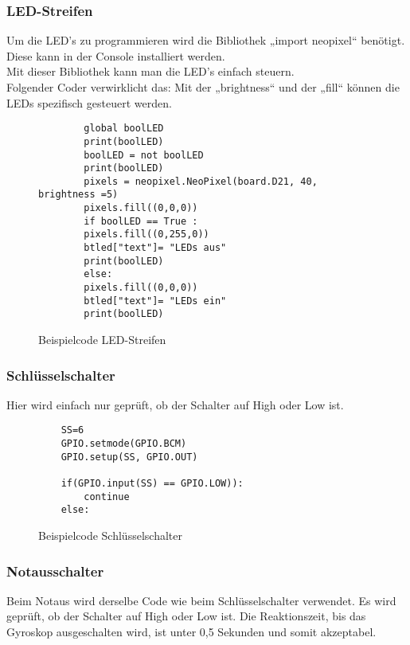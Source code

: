 \subsubsection{LED-Streifen}\label{sec:test Led}
Um die LED’s zu programmieren wird die Bibliothek „import neopixel“ benötigt. Diese kann in der Console installiert werden.\\
\vspace{3mm}
Mit dieser Bibliothek kann man die LED’s einfach steuern.\\
\vspace{3mm}
Folgender Coder verwirklicht das: Mit der „brightness“ und der „fill“ können die LEDs spezifisch gesteuert werden.\\
\vspace{3mm}
\begin{figure}[H]
	\centering
	\begin{verbatim}
		global boolLED
		print(boolLED)
		boolLED = not boolLED
		print(boolLED)
		pixels = neopixel.NeoPixel(board.D21, 40, brightness =5)
		pixels.fill((0,0,0))
		if boolLED == True :
		pixels.fill((0,255,0))
		btled["text"]= "LEDs aus"
		print(boolLED)
		else:
		pixels.fill((0,0,0))
		btled["text"]= "LEDs ein"
		print(boolLED)
	\end{verbatim}
	\caption{Beispielcode LED-Streifen}
\end{figure}


\subsubsection{Schlüsselschalter}\label{sec:test schlüssel}
Hier wird einfach nur geprüft, ob der Schalter auf High oder Low ist.
\begin{figure}[H]
    \centering
    \begin{verbatim}
    SS=6
    GPIO.setmode(GPIO.BCM)
    GPIO.setup(SS, GPIO.OUT)

    if(GPIO.input(SS) == GPIO.LOW)):
        continue
    else:
    \end{verbatim}
    \caption{Beispielcode Schlüsselschalter}
\end{figure}

\subsubsection{Notausschalter}\label{sec:test notaus}
Beim Notaus wird derselbe Code wie beim Schlüsselschalter verwendet. Es wird geprüft, ob der Schalter auf High oder Low ist. Die Reaktionszeit, bis das Gyroskop ausgeschalten wird, ist unter 0,5 Sekunden und somit akzeptabel.  
